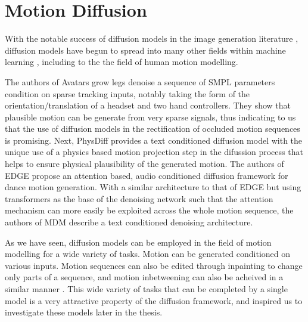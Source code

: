 \section{Motion Diffusion}
\label{sec:related_diffusion}

With the notable success of diffusion models in the image generation literature \cite{ddpm, diffusion_beats_gans, stable_diffusion}, diffusion models have begun to spread into many other fields within machine learning \cite{diffusion_review}, including to the the field of human motion modelling.


The authors of Avatars grow legs \cite{AvatarsGrowLegs} denoise a sequence of SMPL \cite{SMPL} parameters condition on sparse tracking inputs, notably taking the form of the orientation/translation of a headset and two hand controllers. They show that plausible motion can be generate from very sparse signals, thus indicating to us that the use of diffusion models in the rectification of occluded motion sequences is promising. Next, PhysDiff \cite{PhysDiff} provides a text conditioned diffusion model with the unique use of a physics based motion projection step in the difussion process that helps to ensure physical plausibility of the generated motion. The authors of EDGE \cite{EDGE} propose an attention based, audio conditioned diffusion framework for dance motion generation. With a similar architecture to that of EDGE \cite{EDGE} but using transformers as the base of the denoising network such that the attention mechanism can more easily be exploited across the whole motion sequence, the authors of MDM \cite{MDM} describe a text conditioned denoising architecture.

As we have seen, diffusion models can be employed in the field of motion modelling for a wide variety of tasks. Motion can be generated \cite{MDM, EDGE, AvatarsGrowLegs} conditioned on various inputs. Motion sequences can also be edited through inpainting \cite{diffusion_inpainting, MDM} to change only parts of a sequence, and motion inbetweening can also be acheived in a similar manner \cite{MDM}. This wide variety of tasks that can be completed by a single model is a very attractive property of the diffusion framework, and inspired us to investigate these models later in the thesis.